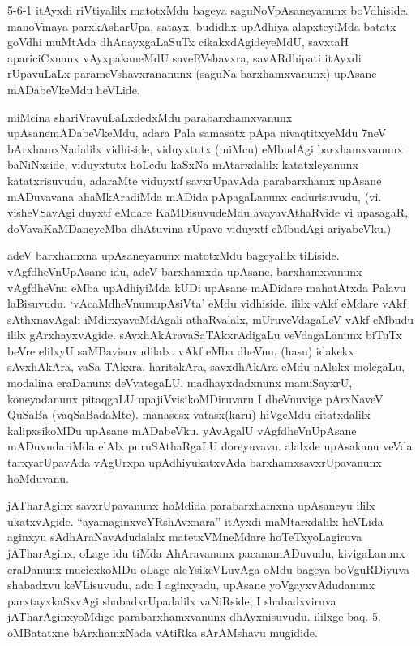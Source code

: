 
\begin{artha}
5-6-1 itAyxdi riVtiyalilx matotxMdu bageya saguNoVpAsaneyanunx boVdhiside. manoVmaya parxkAsharUpa, satayx, budidhx upAdhiya alapxteyiMda batatx goVdhi muMtAda dhAnayxgaLaSuTx cikakxdAgideyeMdU, savxtaH apariciCxnanx vAyxpakaneMdU saveRVshavxra, savARdhipati itAyxdi rUpavuLaLx parameVshavxrananunx (saguNa barxhamxvanunx) upAsane mADabeVkeMdu heVLide.
\end{artha}


\begin{artha}
miMcina shariVravuLaLxdedxMdu parabarxhamxvanunx upAsanemADabeVkeMdu, adara Pala samasatx pApa nivaqtitxyeMdu 7neV bArxhamxNadalilx vidhiside, viduyxtutx (miMcu) eMbudAgi barxhamxvanunx baNiNxside, viduyxtutx hoLedu kaSxNa mAtarxdalilx katatxleyanunx katatxrisuvudu, adaraMte viduyxtf savxrUpavAda parabarxhamx upAsane mADuvavana ahaMkAradiMda mADida pApagaLanunx cadurisuvudu, (vi. visheVSavAgi duyxtf eMdare KaMDisuvudeMdu avayavAthaRvide vi upasagaR, doVavaKaMDaneyeMba dhAtuvina rUpave viduyxtf eMbudAgi ariyabeVku.)
\end{artha}

\begin{artha}
adeV barxhamxna upAsaneyanunx matotxMdu bageyalilx tiLiside. vAgfdheVnUpAsane idu, adeV barxhamxda upAsane, barxhamxvanunx vAgfdheVnu eMba upAdhiyiMda kUDi upAsane mADidare mahatAtxda Palavu laBisuvudu. `vAcaMdheVnumupAsiVta' eMdu vidhiside. ililx vAkf eMdare vAkf sAthxnavAgali iMdirxyaveMdAgali athaRvalalx, mUruveVdagaLeV vAkf eMbudu ililx gArxhayxvAgide. sAvxhAkAravaSaTAkxrAdigaLu veVdagaLanunx biTuTx beVre elilxyU saMBavisuvudilalx. vAkf eMba dheVnu, (hasu) idakekx sAvxhAkAra, vaSa TAkxra, haritakAra, savxdhAkAra eMdu nAlukx molegaLu, modalina eraDanunx deVvategaLU, madhayxdadxnunx manuSayxrU, koneyadanunx pitaqgaLU upajiVvisikoMDiruvaru I dheVnuvige pArxNaveV QuSaBa (vaqSaBadaMte). manasesx vatasx(karu) hiVgeMdu citatxdalilx kalipxsikoMDu upAsane mADabeVku. yAvAgalU vAgfdheVnUpAsane mADuvudariMda elAlx puruSAthaRgaLU doreyuvavu. alalxde upAsakanu veVda tarxyarUpavAda vAgUrxpa upAdhiyukatxvAda barxhamxsavxrUpavanunx hoMduvanu.
\end{artha}

\begin{artha}
jATharAginx savxrUpavanunx hoMdida parabarxhamxna upAsaneyu ililx ukatxvAgide. ``ayamaginxveYRshAvxnara'' itAyxdi maMtarxdalilx heVLida aginxyu sAdhAraNavAdudalalx matetxVMneMdare hoTeTxyoLagiruva jATharAginx, oLage idu tiMda AhAravanunx pacanamADuvudu, kivigaLanunx eraDanunx mucicxkoMDu oLage aleYsikeVLuvAga oMdu bageya boVguRDiyuva shabadxvu keVLisuvudu, adu I aginxyadu, upAsane yoVgayxvAdudanunx parxtayxkaSxvAgi shabadxrUpadalilx vaNiRside, I shabadxviruva jATharAginxyoMdige parabarxhamxvanunx dhAyxnisuvudu. ililxge baq. 5. oMBatatxne bArxhamxNada vAtiRka sArAMshavu mugidide.
\end{artha}

